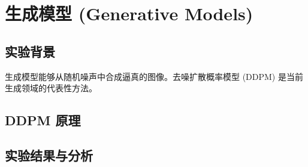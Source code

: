 \chapter{生成模型 (Generative Models)}
\label{chap:generative_models}

\section{实验背景}
生成模型能够从随机噪声中合成逼真的图像。去噪扩散概率模型 (DDPM) 是当前生成领域的代表性方法。

\section{DDPM 原理}

\section{实验结果与分析}
